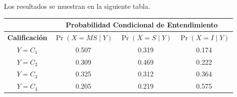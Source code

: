 \documentclass[ a4paper, twoside, 11pt]{article}
\begin{document}
\begin{problem}
Los resultados se muestran en la siguiente tabla. 
\begin{table}[H]
\centering
\begin{tabular}{c|c|c|c|}
\cline{2-4}
 & \multicolumn{3}{c|}{\textbf{Probabilidad Condicional de Entendimiento}} \\ \hline
\multicolumn{1}{|c|}{\textbf{Calificaci\'on}} & $\Pr( X=MS \mid Y)$ & $\Pr( X=S \mid Y)$ & $\Pr( X=I \mid Y)$ \\ \hline
\multicolumn{1}{|c|}{$Y=C_1$} & 0.507 & 0.319 & 0.174 \\ \hline
\multicolumn{1}{|c|}{$Y=C_2$} & 0.309 & 0.469 & 0.222 \\ \hline
\multicolumn{1}{|c|}{$Y=C_3$} & 0.325 & 0.312 & 0.364 \\ \hline
\multicolumn{1}{|c|}{$Y=C_4$} & 0.205 & 0.219 & 0.575 \\ \hline
\end{tabular}
\end{table}

\end{problem}
\vspace{\baselineskip}
\end{document}
